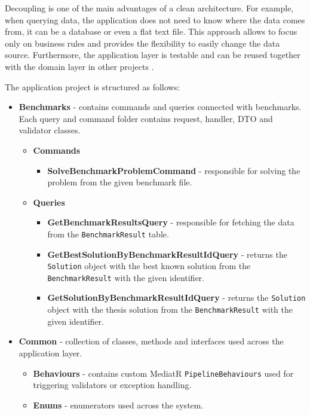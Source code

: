 \documentclass[a4paper,twoside,12pt]{book}
\begin{document}
Decoupling is one of the main advantages of a clean architecture. For example, when querying data, the application does not need to know where the data comes from, it can be a database or even a flat text file. This approach allows to focus only on business rules and provides the flexibility to easily change the data source. Furthermore, the application layer is testable and can be reused together with the domain layer in other projects \cite{bib:cleanArchitectureApp}.

The application project is structured as follows: 


\begin{itemize}
    \item \textbf{Benchmarks} - contains commands and queries connected with benchmarks. Each query and command folder contains request, handler, DTO and validator classes.
    \begin{itemize}
    \item \textbf{Commands}
        \begin{itemize}
        \item \textbf{SolveBenchmarkProblemCommand} - responsible for solving the problem from the given benchmark file. 
        \end{itemize}
    \item \textbf{Queries}
        \begin{itemize}
        \item \textbf{GetBenchmarkResultsQuery} - responsible for fetching the data from the \lstinline{BenchmarkResult} table.
        \item \textbf{GetBestSolutionByBenchmarkResultIdQuery} - returns the \lstinline{Solution} object with the best known solution from the \lstinline{BenchmarkResult} with the given identifier.
        \item \textbf{GetSolutionByBenchmarkResultIdQuery} - returns the \lstinline{Solution} object with the thesis solution from the \lstinline{BenchmarkResult} with the given identifier.
        \end{itemize}
    \end{itemize}
\item \textbf{Common} - collection of classes, methods and interfaces used across the application layer.
    \begin{itemize}
        \item \textbf{Behaviours} - contains custom MediatR \lstinline{PipelineBehaviours} used for triggering validators or exception handling.
        \item \textbf{Enums} - enumerators used across the system.

\end{itemize}
\end{itemize}
\end{document}
